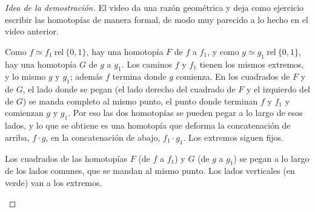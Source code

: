 \documentclass[11pt]{article}
\begin{document}
\begin{proof}[Idea de la demostración]
El video da una razón geométrica y deja como ejercicio escribir las homotopías de manera formal, de modo muy parecido a lo hecho en el video anterior.

Como $f\simeq f_1\ \mathrm{rel}\ \{0,1\}$, hay una homotopía $F$ de $f$ a $f_1$, y como $g\simeq g_1\ \mathrm{rel}\ \{0,1\}$, hay una homotopía $G$ de $g$ a $g_1$. Los caminos $f$ y $f_1$ tienen los mismos extremos, y lo mismo $g$ y $g_1$; además $f$ termina donde $g$ comienza. En los cuadrados de $F$ y de $G$, el lado donde se pegan (el lado derecho del cuadrado de $F$ y el izquierdo del de $G$) se manda completo al mismo punto, el punto donde terminan $f$ y $f_1$ y comienzan $g$ y $g_1$. Por eso las dos homotopías se pueden pegar a lo largo de esos lados, y lo que se obtiene es una homotopía que deforma la concatenación de arriba, $f\cdot g$, en la concatenación de abajo, $f_1\cdot g_1$. Los extremos siguen fijos.

\begin{center}
\par\smallskip
\begin{minipage}{0.9\textwidth}\small\centering
Los cuadrados de las homotopías $F$ (de $f$ a $f_1$) y $G$ (de $g$ a $g_1$) se pegan a lo largo de los lados comunes, que se mandan al mismo punto. Los lados verticales (en verde) van a los extremos.
\end{minipage}
\end{center}
\end{proof}
\end{document}

